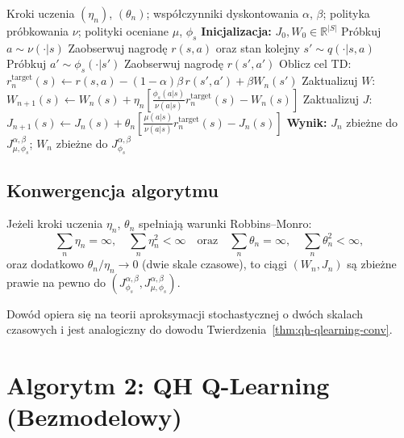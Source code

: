 \begin{algorithm}[H]
\caption{Bezmodelowa ocena polityki dla dyskontowania QH}
\label{alg:policy-eval}
\begin{algorithmic}[1]
\REQUIRE Kroki uczenia $(\eta_n)$, $(\theta_n)$; współczynniki dyskontowania $\alpha$, $\beta$; polityka próbkowania $\nu$; polityki oceniane $\mu$, $\phi_s$
\STATE \textbf{Inicjalizacja:} $J_0, W_0 \in \mathbb{R}^{|S|}$
\STATE Próbkuj $a \sim \nu(\cdot|s)$
\STATE Zaobserwuj nagrodę $r(s, a)$ oraz stan kolejny $s' \sim q(\cdot|s, a)$
\STATE Próbkuj $a' \sim \phi_s(\cdot|s')$
\STATE Zaobserwuj nagrodę $r(s', a')$
\STATE Oblicz cel TD: $r^{\text{target}}_n(s) \leftarrow r(s, a) - (1 - \alpha)\beta \, r(s', a') + \beta W_n(s')$
\STATE Zaktualizuj $W$: $W_{n+1}(s) \leftarrow W_n(s) + \eta_n \left[ \frac{\phi_s(a|s)}{\nu(a|s)} r^{\text{target}}_n(s) - W_n(s) \right]$
\STATE Zaktualizuj $J$: $J_{n+1}(s) \leftarrow J_n(s) + \theta_n \left[ \frac{\mu(a|s)}{\nu(a|s)} r^{\text{target}}_n(s) - J_n(s) \right]$
\ENDFOR
\ENDFOR
\STATE \textbf{Wynik:} $J_n$ zbieżne do $J^{\alpha, \beta}_{\mu, \phi_s}$; $W_n$ zbieżne do $J^{\alpha, \beta}_{\phi_s}$
\end{algorithmic}
\end{algorithm}

\subsection{Konwergencja algorytmu}

\begin{theorem}
\label{thm:policy-eval-conv}
Jeżeli kroki uczenia $\eta_n$, $\theta_n$ spełniają warunki Robbins--Monro:
\[
\sum_n \eta_n = \infty, \quad \sum_n \eta_n^2 < \infty \quad \text{oraz} \quad \sum_n \theta_n = \infty, \quad \sum_n \theta_n^2 < \infty,
\]
oraz dodatkowo $\theta_n / \eta_n \to 0$ (dwie skale czasowe), to ciągi $(W_n, J_n)$ są zbieżne prawie na pewno do $(J^{\alpha, \beta}_{\phi_s}, J^{\alpha, \beta}_{\mu, \phi_s})$.
\end{theorem}

Dowód opiera się na teorii aproksymacji stochastycznej o dwóch skalach czasowych i jest analogiczny do dowodu Twierdzenia~\ref{thm:qh-qlearning-conv}.

\section{Algorytm 2: QH Q-Learning (Bezmodelowy)}

